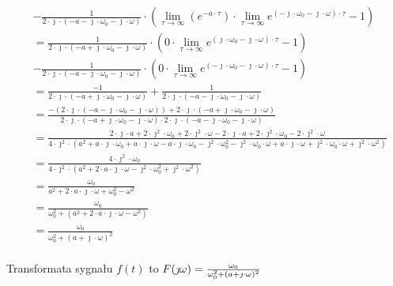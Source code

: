 \begin{task}
\begin{align*}
&-\frac{1}{2 \cdot \jmath \cdot (-a - \jmath \cdot \omega_{0} -\jmath \cdot \omega)} \cdot \left(\lim_{\tau \rightarrow \infty }
( e^{-a \cdot \tau})\cdot \lim_{\tau \rightarrow \infty } e^{(-\jmath \cdot \omega_{0} -\jmath \cdot \omega) \cdot \tau}-1\right)\\
&=\frac{1}{2 \cdot \jmath \cdot (-a + \jmath \cdot \omega_{0} -\jmath \cdot \omega)} \cdot \left(0 \cdot \lim_{\tau \rightarrow \infty } e^{(\jmath \cdot \omega_{0} -\jmath \cdot \omega) \cdot \tau}-1\right)\\
&-\frac{1}{2 \cdot \jmath \cdot (-a - \jmath \cdot \omega_{0} -\jmath \cdot \omega)} \cdot \left(0 \cdot \lim_{\tau \rightarrow \infty } e^{(-\jmath \cdot \omega_{0} -\jmath \cdot \omega) \cdot \tau}-1\right)\\
&=\frac{-1}{2 \cdot \jmath \cdot (-a + \jmath \cdot \omega_{0} -\jmath \cdot \omega)}+\frac{1}{2 \cdot \jmath \cdot (-a - \jmath \cdot \omega_{0} -\jmath \cdot \omega)}\\
&=\frac{-(2 \cdot \jmath \cdot (-a - \jmath \cdot \omega_{0} -\jmath \cdot \omega))+2 \cdot \jmath \cdot (-a + \jmath \cdot \omega_{0} -\jmath \cdot \omega)}{2 \cdot \jmath \cdot (-a + \jmath \cdot \omega_{0} -\jmath \cdot \omega) \cdot 2 \cdot \jmath \cdot (-a - \jmath \cdot \omega_{0} -\jmath \cdot \omega)}\\
&=\frac{2 \cdot \jmath \cdot a + 2 \cdot \jmath^{2} \cdot \omega_{0} + 2 \cdot \jmath^{2} \cdot \omega - 2 \cdot \jmath \cdot a + 2 \cdot \jmath^{2} \cdot \omega_{0} - 2 \cdot \jmath^{2} \cdot \omega}
{4 \cdot \jmath^{2} \cdot 
	(a^{2}+ a \cdot \jmath \cdot \omega_{0}+ a \cdot \jmath \cdot \omega
-a \cdot \jmath \cdot \omega_{0}- \jmath^{2} \cdot \omega_{0}^{2}- \jmath^{2} \cdot \omega_{0} \cdot \omega
+a \cdot \jmath \cdot \omega+ \jmath^{2} \cdot \omega_{0} \cdot \omega + \jmath^{2} \cdot \omega^{2})}\\
&=\frac{4 \cdot \jmath^{2} \cdot \omega_{0}}
{4 \cdot \jmath^{2} \cdot (a^{2} + 2 \cdot a \cdot \jmath \cdot \omega - \jmath^{2} \cdot \omega_{0}^{2} + \jmath^{2} \cdot \omega^{2})}\\
&=\frac{\omega_{0}}{a^{2} + 2 \cdot a \cdot \jmath \cdot \omega + \omega_{0}^{2} - \omega^{2}}\\
&=\frac{\omega_{0}}{\omega_{0}^{2} + (a^{2} + 2 \cdot a \cdot \jmath \cdot \omega - \omega^{2})}\\
&=\frac{\omega_{0}}{\omega_{0}^{2} + (a + \jmath \cdot \omega)^{2}}\\
\end{align*}

Transformata sygnału $f(t)$ to $F(\jmath \omega)=\frac{\omega_{0}}{\omega_{0}^{2} + (a + \jmath \cdot \omega)^{2}}\\$

\end{task}
